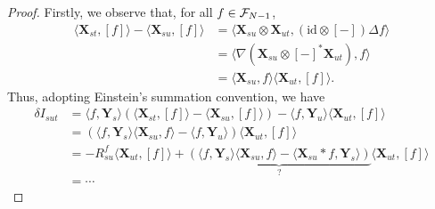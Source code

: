 \documentclass[11pt]{style/preprint}
\begin{document}
\begin{proof}
  Firstly, we observe that, for all \(f \in {\mathcal F}_{N - 1}\),
  \begin{align*}
    \langle\mathbf{X}_{st}, [f]\rangle - \langle \mathbf{X}_{su}, [f]\rangle 
    & = \langle \mathbf{X}_{su} \otimes \mathbf{X}_{ut}, (\text{id} \otimes [-]) \Delta f\rangle\\
    & = \langle \nabla (\mathbf{X}_{su} \otimes [-]^* \mathbf{X}_{ut}), f\rangle\\ 
    & = \langle \mathbf{X}_{su}, f\rangle \langle \mathbf{X}_{ut}, [f]\rangle.
  \end{align*}
  Thus, adopting Einstein's summation convention, we have
  \begin{align*}
    \delta I_{sut} & = \langle f, \mathbf{Y}_s\rangle(\langle\mathbf{X}_{st}, [f]\rangle - \langle \mathbf{X}_{su}, [f]\rangle) 
      - \langle f, \mathbf{Y}_u\rangle \langle \mathbf{X}_{ut}, [f]\rangle\\
    & = (\langle f, \mathbf{Y}_s\rangle \langle \mathbf{X}_{su}, f\rangle - \langle f, \mathbf{Y}_u\rangle) 
        \langle \mathbf{X}_{ut}, [f]\rangle\\
    & = - R^f_{su} \langle \mathbf{X}_{ut}, [f]\rangle 
      + \underbrace{(\langle f, \mathbf{Y}_s\rangle \langle \mathbf{X}_{su}, f\rangle -
          \langle \mathbf{X}_{su} * f, \mathbf{Y}_s\rangle)}_{\text{?}}
        \langle \mathbf{X}_{ut}, [f]\rangle\\
    & = \cdots
  \end{align*}
\end{proof}
\end{document}
